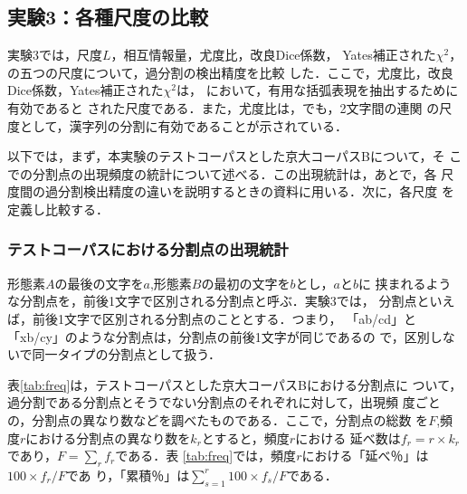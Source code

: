 \vspace{17mm}

\subsection{実験3：各種尺度の比較}
\label{sec:comp}

実験3では，尺度$L$，相互情報量，尤度比，改良Dice係数\cite{kitamura97}，
Yates補正された$\chi^2$，の五つの尺度について，過分割の検出精度を比較
した．ここで，尤度比，改良Dice係数，Yates補正された$\chi^2$は，
\cite{hisamitsu97}において，有用な括弧表現を抽出するために有効であると
された尺度である．また，尤度比は，\cite{kageura97}でも，2文字間の連関
の尺度として，漢字列の分割に有効であることが示されている．

以下では，まず，本実験のテストコーパスとした京大コーパスBについて，そ
こでの分割点の出現頻度の統計について述べる．この出現統計は，あとで，各
尺度間の過分割検出精度の違いを説明するときの資料に用いる．次に，各尺度
を定義し比較する．

\subsubsection*{テストコーパスにおける分割点の出現統計}

形態素$A$の最後の文字を$a$,形態素$B$の最初の文字を$b$とし，$a$と$b$に
挟まれるような分割点を，前後1文字で区別される分割点と呼ぶ．実験3では，
分割点といえば，前後1文字で区別される分割点のこととする．つまり，
「ab/cd」と「xb/cy」のような分割点は，分割点の前後1文字が同じであるの
で，区別しないで同一タイプの分割点として扱う．

表\ref{tab:freq}は，テストコーパスとした京大コーパスBにおける分割点に
ついて，過分割である分割点とそうでない分割点のそれぞれに対して，出現頻
度ごとの，分割点の異なり数などを調べたものである．ここで，分割点の総数
を$F$,頻度$r$における分割点の異なり数を$k_r$とすると，頻度$r$における
延べ数は$f_r = r \times k_r $であり，$F = \sum_r f_r$である．表
\ref{tab:freq}では，頻度$r$における「延べ％」は$100 \times f_r/F$であ
り，「累積％」は$\sum_{s=1}^{r} 100 \times f_s/F$である．

